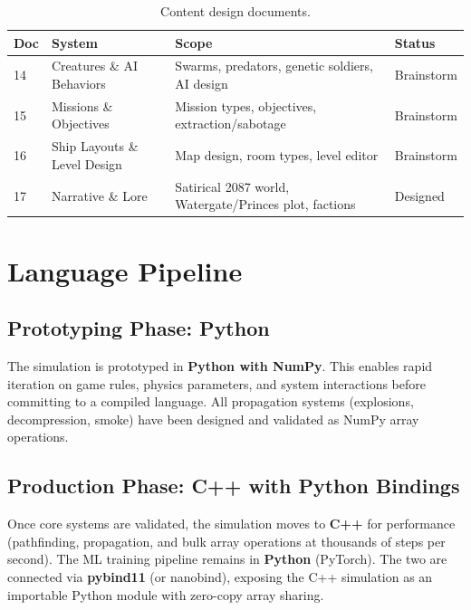 \documentclass[11pt,a4paper]{article}
\begin{document}
\begin{table}[h]
\centering
\begin{tabular}{@{}llp{5.5cm}l@{}}
\toprule
\textbf{Doc} & \textbf{System} & \textbf{Scope} & \textbf{Status} \\
\midrule
14 & Creatures \& AI Behaviors & Swarms, predators, genetic soldiers, AI design & Brainstorm \\
15 & Missions \& Objectives & Mission types, objectives, extraction/sabotage & Brainstorm \\
16 & Ship Layouts \& Level Design & Map design, room types, level editor & Brainstorm \\
17 & Narrative \& Lore & Satirical 2087 world, Watergate/Princes plot, factions & Designed \\
\bottomrule
\end{tabular}
\caption{Content design documents.}
\label{tab:content}
\end{table}

\section{Language Pipeline}
\label{sec:language}

\subsection{Prototyping Phase: Python}

The simulation is prototyped in \textbf{Python with NumPy}.  This
enables rapid iteration on game rules, physics parameters, and system
interactions before committing to a compiled language.  All propagation
systems (explosions, decompression, smoke) have been designed and
validated as NumPy array operations.

\subsection{Production Phase: C++ with Python Bindings}

Once core systems are validated, the simulation moves to \textbf{C++}
for performance (pathfinding, propagation, and bulk array operations at
thousands of steps per second).  The ML training pipeline remains in
\textbf{Python} (PyTorch).  The two are connected via \textbf{pybind11}
(or nanobind), exposing the C++ simulation as an importable Python
module with zero-copy array sharing.
\end{document}
